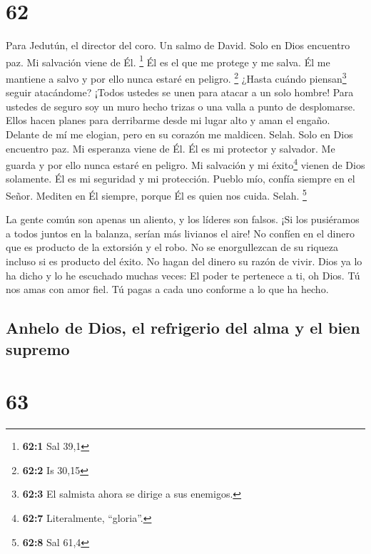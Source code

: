 \hypertarget{section-61}{%
\section{62}\label{section-61}}

Para Jedutún, el director del coro. Un salmo de David. 
Solo en Dios encuentro paz. Mi salvación viene de Él. \footnote{\textbf{62:1}
  Sal 39,1}  Él es el que me protege y me salva. Él me
mantiene a salvo y por ello nunca estaré en peligro. \footnote{\textbf{62:2}
  Is 30,15}  ¿Hasta cuándo piensan\footnote{\textbf{62:3}
  El salmista ahora se dirige a sus enemigos.} seguir atacándome? ¡Todos
ustedes se unen para atacar a un solo hombre! Para ustedes de seguro soy
un muro hecho trizas o una valla a punto de desplomarse. 
Ellos hacen planes para derribarme desde mi lugar alto y aman el engaño.
Delante de mí me elogian, pero en su corazón me maldicen. Selah.
 Solo en Dios encuentro paz. Mi esperanza viene de Él.
 Él es mi protector y salvador. Me guarda y por ello nunca
estaré en peligro.  Mi salvación y mi éxito\footnote{\textbf{62:7}
  Literalmente, ``gloria''.} vienen de Dios solamente. Él es mi
seguridad y mi protección.  Pueblo mío, confía siempre en
el Señor. Mediten en Él siempre, porque Él es quien nos cuida. Selah.
\footnote{\textbf{62:8} Sal 61,4}

 La gente común son apenas un aliento, y los líderes son
falsos. ¡Si los pusiéramos a todos juntos en la balanza, serían más
livianos el aire!  No confíen en el dinero que es
producto de la extorsión y el robo. No se enorgullezcan de su riqueza
incluso si es producto del éxito. No hagan del dinero su razón de vivir.
 Dios ya lo ha dicho y lo he escuchado muchas veces: El
poder te pertenece a ti, oh Dios.  Tú nos amas con amor
fiel. Tú pagas a cada uno conforme a lo que ha hecho.

\hypertarget{anhelo-de-dios-el-refrigerio-del-alma-y-el-bien-supremo}{%
\subsection{Anhelo de Dios, el refrigerio del alma y el bien
supremo}\label{anhelo-de-dios-el-refrigerio-del-alma-y-el-bien-supremo}}

\hypertarget{section-62}{%
\section{63}\label{section-62}}

